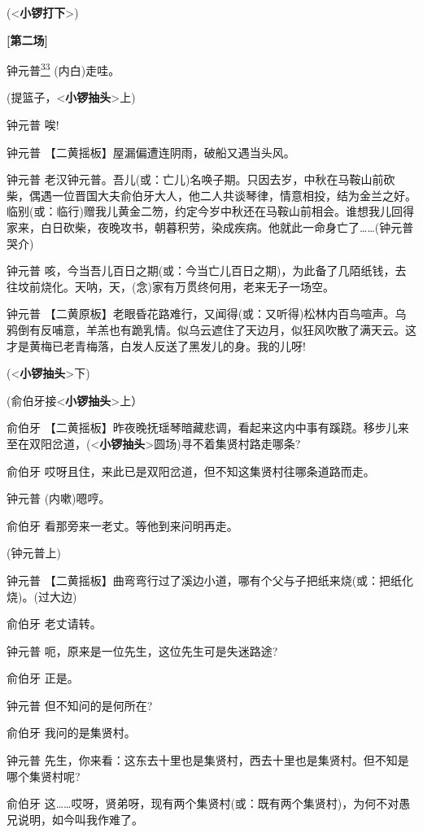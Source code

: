 (\textless{}\textbf{小锣打下}\textgreater{})

\textbf{{[}第二场{]}}

钟元普\protect\hyperlink{fn33}{\textsuperscript{33}} (内白)走哇。

(提篮子，\textless{}\textbf{小锣抽头}\textgreater{}上)

钟元普 唉!

钟元普 【二黄摇板】屋漏偏遭连阴雨，破船又遇当头风。

钟元普
老汉钟元普。吾儿(或：亡儿)名唤子期。只因去岁，中秋在马鞍山前砍柴，偶遇一位晋国大夫俞伯牙大人，他二人共谈琴律，情意相投，结为金兰之好。临别(或：临行)赠我儿黄金二笏，约定今岁中秋还在马鞍山前相会。谁想我儿回得家来，白日砍柴，夜晚攻书，朝暮积劳，染成疾病。他就此一命身亡了\ldots{}\ldots{}(钟元普哭介)

钟元普
咳，今当吾儿百日之期(或：今当亡儿百日之期)，为此备了几陌纸钱，去往坟前烧化。天呐，天，(念)家有万贯终何用，老来无子一场空。

钟元普
【二黄原板】老眼昏花路难行，又闻得(或：又听得)松林内百鸟喧声。乌鸦倒有反哺意，羊羔也有跪乳情。似乌云遮住了天边月，似狂风吹散了满天云。这才是黄梅已老青梅落，白发人反送了黑发儿的身。我的儿呀!

(\textless{}\textbf{小锣抽头}\textgreater{}下)

(俞伯牙接\textless{}\textbf{小锣抽头}\textgreater{}上）

俞伯牙
【二黄摇板】昨夜晚抚瑶琴暗藏悲调，看起来这内中事有蹊跷。移步儿来至在双阳岔道，(\textless{}\textbf{小锣抽头}\textgreater{}圆场)寻不着集贤村路走哪条?

俞伯牙 哎呀且住，来此已是双阳岔道，但不知这集贤村往哪条道路而走。

钟元普 (内嗽)嗯哼。

俞伯牙 看那旁来一老丈。等他到来问明再走。

(钟元普上)

钟元普
【二黄摇板】曲弯弯行过了溪边小道，哪有个父与子把纸来烧(或：把纸化烧)。(过大边)

俞伯牙 老丈请转。

钟元普 呃，原来是一位先生，这位先生可是失迷路途?

俞伯牙 正是。

钟元普 但不知问的是何所在?

俞伯牙 我问的是集贤村。

钟元普
先生，你来看：这东去十里也是集贤村，西去十里也是集贤村。但不知是哪个集贤村呢?

俞伯牙
这\ldots{}\ldots{}哎呀，贤弟呀，现有两个集贤村(或：既有两个集贤村)，为何不对愚兄说明，如今叫我作难了。

